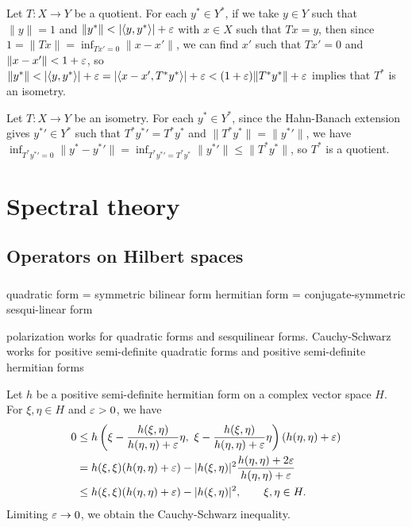 \documentclass{../../large}
\begin{document}
\begin{prb}
\end{prb}


\begin{prb}
\end{prb}



Let $T:X\to Y$ be a quotient.
For each $y^*\in Y^*$, if we take $y\in Y$ such that $\|y\|=1$ and $\|y^*\|<|\<y,y^*\>|+\e$ with $x\in X$ such that $Tx=y$, then since $1=\|Tx\|=\inf_{Tx'=0}\|x-x'\|$, we can find $x'$ such that $Tx'=0$ and $\|x-x'\|<1+\varepsilon$, so $\|y^*\|<|\<y,y^*\>|+\e=|\<x-x',T^*y^*\>|+\e<(1+\e)\|T^*y^*\|+\e$ implies that $T^*$ is an isometry.

Let $T:X\to Y$ be an isometry.
For each $y^*\in Y^*$, since the Hahn-Banach extension gives ${y^*}'\in Y^*$ such that $T^*{y^*}'=T^*y^*$ and $\|T^*y^*\|=\|{y^*}'\|$, we have $\inf_{T^*{y^*}'=0}\|y^*-{y^*}'\|=\inf_{T^*{y^*}'=T^*y^*}\|{y^*}'\|\le\|T^*y^*\|$, so $T^*$ is a quotient.



\part{Spectral theory}

\chapter{Operators on Hilbert spaces}

\section{}

\begin{prb}
quadratic form = symmetric bilinear form
hermitian form = conjugate-symmetric sesqui-linear form

polarization works for quadratic forms and sesquilinear forms.
Cauchy-Schwarz works for positive semi-definite quadratic forms and positive semi-definite hermitian forms

\end{prb}
\begin{pf}
Let $h$ be a positive semi-definite hermitian form on a complex vector space $H$.
For $\xi,\eta\in H$ and $\varepsilon>0$, we have
\begin{align*}
0&\le h\left(\xi-\frac{h(\xi,\eta)}{h(\eta,\eta)+\e}\eta,\ \xi-\frac{h(\xi,\eta)}{h(\eta,\eta)+\e}\eta\right)(h(\eta,\eta)+\e)\\
&=h(\xi,\xi)(h(\eta,\eta)+\e)-|h(\xi,\eta)|^2\frac{h(\eta,\eta)+2\e}{h(\eta,\eta)+\e}\\
&\le h(\xi,\xi)(h(\eta,\eta)+\e)-|h(\xi,\eta)|^2,\qquad\xi,\eta\in H.
\end{align*}
Limiting $\varepsilon\to0$, we obtain the Cauchy-Schwarz inequality.
\end{pf}
\end{document}
